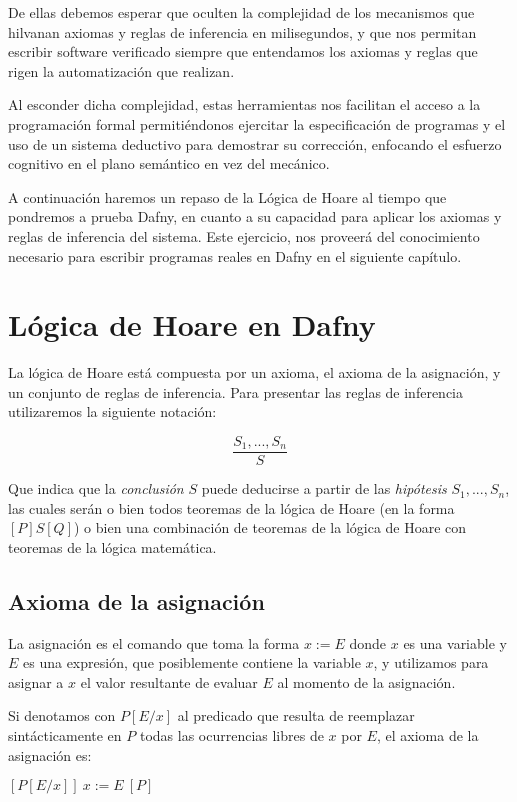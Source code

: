 \documentclass[12pt, a4paper, openany, fleqn]{book}
\newcommand{\hoare}[3]{\ensuremath{[#1]\ #2\ [#3]}}
\newcommand{\inferenceRule}[2]{
    \begin{equation*}
        \frac{#1}{#2}
    \end{equation*}
}
\begin{document}
    De ellas debemos esperar que oculten la complejidad de los mecanismos que hilvanan axiomas y reglas de inferencia en milisegundos, y que nos permitan escribir software verificado siempre que entendamos los axiomas y reglas que rigen la automatización que realizan.

    Al esconder dicha complejidad, estas herramientas nos facilitan el acceso a la programación formal permitiéndonos ejercitar la especificación de programas y el uso de un sistema deductivo para demostrar su corrección, enfocando el esfuerzo cognitivo en el plano semántico en vez del mecánico.

    A continuación haremos un repaso de la Lógica de Hoare al tiempo que pondremos a prueba Dafny, en cuanto a su capacidad para aplicar los axiomas y reglas de inferencia del sistema. Este ejercicio, nos proveerá del conocimiento necesario para escribir programas reales en Dafny en el siguiente capítulo.

    \section{Lógica de Hoare en Dafny}
    La lógica de Hoare está compuesta por un axioma, el axioma de la asignación, y un conjunto de reglas de inferencia. Para presentar las reglas de inferencia utilizaremos la siguiente notación:
    \inferenceRule{S_1, ..., S_n}{S}
    Que indica que la \textit{conclusión} $S$ puede deducirse a partir de las \textit{hipótesis} $S_1, ..., S_n$, las cuales serán o bien todos teoremas de la lógica de Hoare (en la forma $[P]S[Q]$) o bien una combinación de teoremas de la lógica de Hoare con teoremas de la lógica matemática.

    \subsection{Axioma de la asignación}
    La asignación es el comando que toma la forma $x := E$ donde $x$ es una variable y $E$ es una expresión, que posiblemente contiene la variable $x$, y utilizamos para asignar a $x$ el valor resultante de evaluar $E$ al momento de la asignación.

    Si denotamos con $P[E/x]$ al predicado que resulta de reemplazar sintácticamente en $P$ todas las ocurrencias libres de $x$ por $E$, el axioma de la asignación es:

    \begin{center}
        \hoare{P[E/x]}{x:=E}{P}
    \end{center}
\end{document}
